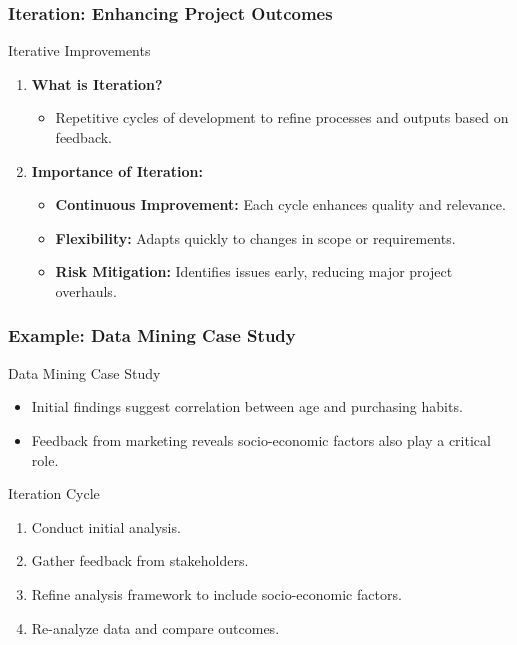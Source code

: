\documentclass[aspectratio=169]{beamer}
\begin{document}
\begin{frame}[fragile]
    \frametitle{Iteration: Enhancing Project Outcomes}
    \begin{block}{Iterative Improvements}
        \begin{enumerate}
            \item \textbf{What is Iteration?}
            \begin{itemize}
                \item Repetitive cycles of development to refine processes and outputs based on feedback.
            \end{itemize}

            \item \textbf{Importance of Iteration:}
            \begin{itemize}
                \item \textbf{Continuous Improvement:} Each cycle enhances quality and relevance.
                \item \textbf{Flexibility:} Adapts quickly to changes in scope or requirements.
                \item \textbf{Risk Mitigation:} Identifies issues early, reducing major project overhauls.
            \end{itemize}
        \end{enumerate}
    \end{block}
\end{frame}

\begin{frame}[fragile]
    \frametitle{Example: Data Mining Case Study}
    \begin{block}{Data Mining Case Study}
        \begin{itemize}
            \item Initial findings suggest correlation between age and purchasing habits.
            \item Feedback from marketing reveals socio-economic factors also play a critical role.
        \end{itemize}
        
        \begin{block}{Iteration Cycle}
            \begin{enumerate}
                \item Conduct initial analysis.
                \item Gather feedback from stakeholders.
                \item Refine analysis framework to include socio-economic factors.
                \item Re-analyze data and compare outcomes.
            \end{enumerate}
        \end{block}
    \end{block}
\end{frame}
\end{document}
